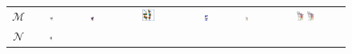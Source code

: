 \begin{figure}[htb]
	\centering
	\setlength\tabcolsep{2pt}
	\begin{tabular}{ccccccc}
		$\mathcal{M}$&\includegraphics[width=0.125\textwidth]{figures/BirdsFlightFull.png} &
		\includegraphics[width=0.125\textwidth]{figures/NNFout.png} &
		\includegraphics[width=0.2\textwidth]{figures/FullPatches.png} &
		\includegraphics[width=0.1\textwidth]{figures/DDISup.png} &
		\includegraphics[width=0.1\textwidth]{figures/CorrsBaseInit.png} &
		\includegraphics[width=0.1\textwidth]{figures/CorrsBaseOutlier.png}
		\includegraphics[width=0.1\textwidth]{figures/CorrsBaseRefine.png}\\
		$\mathcal{N}$ &\includegraphics[width=0.08\textwidth]{figures/BirdsFlightPart.png} &

\end{tabular}
\end{figure}
